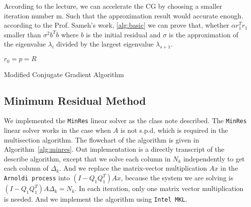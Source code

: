 According to the lecture, we can accelerate the CG by choosing a smaller iteration number m. Such that the approximation result would accurate enough. according to the Prof. Sameh's work, \ref{alg:basic} we can prove that, whether $\alpha r_1^Tr_1$ smaller than $\sigma^2b^Tb$ where $b$ is the initial residual and $\sigma$ is the approximation of the eigenvalue $\lambda_i$ divided by the largest eigenvalue $\lambda_{s+1} $.  \\
  
\begin{algorithm}[h]
	\SetArgSty{}
	{$r_0 = p = R$\;}
	\caption{Modified Conjugate Gradient Algorithm}
	\label{alg:modifiedcg}
\end{algorithm}


\subsection{Minimum Residual Method}
We implemented the {\tt MinRes} linear solver as the class note described. The {\tt MinRes} linear solver works in the case when $A$ is not s.p.d, which is required in the multisection algorithm.  The flowchart of the algorithm is given in Algorithm~\ref{alg:minres}. Out implementation is a directly transcript of the describe algorithm, except that we solve each column in $N_k$ independently to get each column of $\Delta_k$. And we replace the matrix-vector multiplication $Ax$ in the {\tt Arnoldi process} into $\left(I-Q_1 Q_1^T\right)Ax$, because the system we are solving is $\left(I-Q_1 Q_1^T\right)A \Delta_k = N_k$. In each iteration, only one matrix vector multiplication is needed. And we implement the algorithm using {\tt Intel MKL}.

